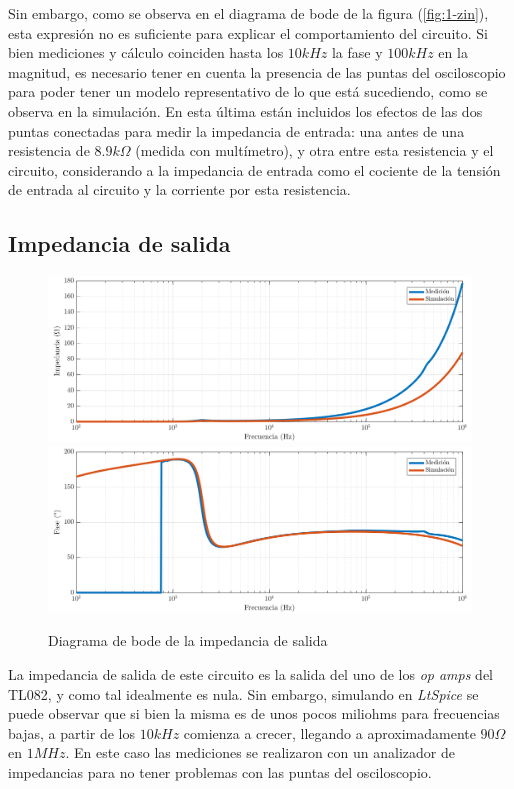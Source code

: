 \documentclass[../../tc_tp3_main.tex]{subfiles}
\begin{document}
Sin embargo, como se observa en el diagrama de bode de la figura (\ref{fig:1-zin}), esta expresi\'on no es suficiente para explicar el comportamiento del circuito. Si bien mediciones y c\'alculo coinciden hasta los $10kHz$ la fase y $100kHz$ en la magnitud, es necesario tener en cuenta la presencia de las puntas del osciloscopio para poder tener un modelo representativo de lo que est\'a sucediendo, como se observa en la simulaci\'on. En esta \'ultima est\'an incluidos los efectos de las dos puntas conectadas para medir la impedancia de entrada: una antes de una resistencia de $8.9k\Omega$ (medida con mult\'imetro), y otra entre esta resistencia y el circuito, considerando a la impedancia de entrada como el cociente de la tensi\'on de entrada al circuito y la corriente por esta resistencia.


\subsection{Impedancia de salida}

\begin{figure}[h!]
	\centering
  	\includegraphics[scale = 0.5]{imagenes/tc_tp3_ej1_zout_mag.png}
  	\includegraphics[scale = 0.5]{imagenes/tc_tp3_ej1_zout_fase.png}
  	\caption{Diagrama de bode de la impedancia de salida}
  	\label{fig:1-zout}
\end{figure}

La impedancia de salida de este circuito es la salida del uno de los \textit{op amps} del TL082, y como tal idealmente es nula. Sin embargo, simulando en \textit{LtSpice} se puede observar que si bien la misma es de unos pocos miliohms para frecuencias bajas, a partir de los $10kHz$ comienza a crecer, llegando a aproximadamente $90\Omega$ en $1MHz$. En este caso las mediciones se realizaron con un analizador de impedancias para no tener problemas con las puntas del osciloscopio. \par
\end{document}
